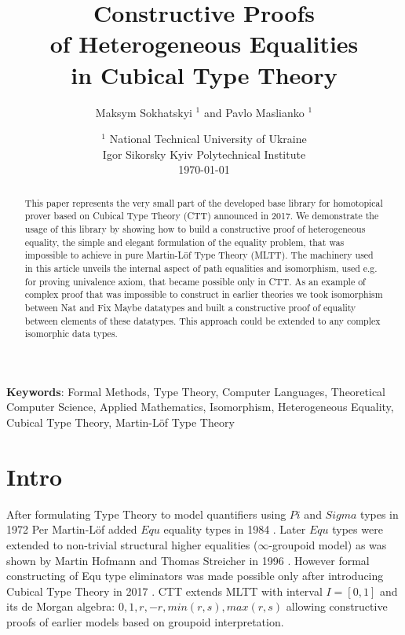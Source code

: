\documentclass{article}
\begin{document}
\title{Constructive Proofs \\
       of Heterogeneous Equalities \\
       in Cubical Type Theory}
\author{Maksym Sokhatskyi $^1$ and Pavlo Maslianko $^1$}
\date{
    $^1$ National Technical University of Ukraine \\
    \small Igor Sikorsky Kyiv Polytechnical Institute\\
    \today
}

\maketitle

\begin{abstract}
This paper represents the very small part of the developed base library for homotopical
prover based on Cubical Type Theory (CTT) announced in 2017. We demonstrate the usage
of this library by showing how to build a constructive proof of heterogeneous equality,
the simple and elegant formulation of the equality problem, that was impossible to achieve
in pure Martin-Löf Type Theory (MLTT). The machinery used in this article unveils
the internal aspect of path equalities and isomorphism, used e.g. for proving univalence
axiom, that became possible only in CTT. As an example of complex proof that was
impossible to construct in earlier theories we took isomorphism between Nat and Fix Maybe
datatypes and built a constructive proof of equality between elements of these datatypes.
This approach could be extended to any complex isomorphic data types.
\end{abstract}

{\bf Keywords}: Formal Methods, Type Theory, Computer Languages,
          Theoretical Computer Science, Applied Mathematics,
          Isomorphism, Heterogeneous Equality, Cubical Type Theory,
          Martin-Löf Type Theory

\newpage
\tableofcontents
\newpage

\section{Intro}

After formulating Type Theory to model quantifiers using $Pi$ and $Sigma$ types in 1972 \cite{Lof72}
Per Martin-Löf added $Equ$ equality types in 1984 \cite{Lof84}. Later $Equ$ types were extended
to non-trivial structural higher equalities ($\infty$-groupoid model) as was shown by Martin Hofmann
and Thomas Streicher in 1996 \cite{Hofmann96}. However formal constructing of Equ type
eliminators was made possible only after introducing Cubical Type Theory in 2017 \cite{Mortberg17}.
CTT extends MLTT with interval $I=[0,1]$ and its de Morgan algebra: $0, 1, r, -r, min(r,s), max(r,s)$
allowing constructive proofs of earlier models based on groupoid interpretation.
\end{document}

